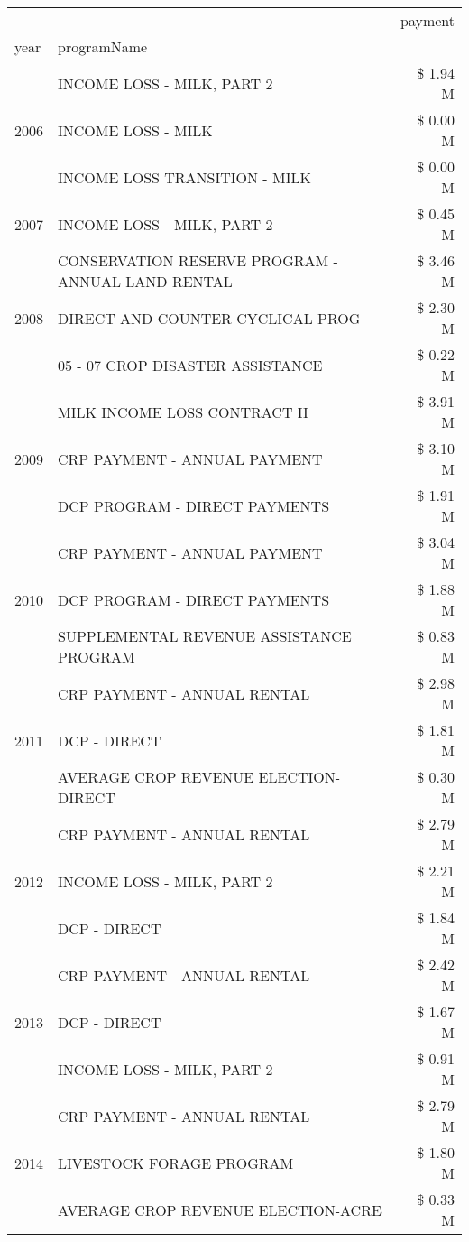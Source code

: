 \begin{tabular}{llr}
\toprule
 &  & payment \\
year & programName &  \\
\midrule
\multirow[t]{3}{*}{2006} & INCOME LOSS - MILK, PART 2 & \$ 1.94 M \\
 & INCOME LOSS - MILK & \$ 0.00 M \\
 & INCOME LOSS TRANSITION - MILK & \$ 0.00 M \\
\cline{1-3}
2007 & INCOME LOSS - MILK, PART 2 & \$ 0.45 M \\
\cline{1-3}
\multirow[t]{3}{*}{2008} & CONSERVATION RESERVE PROGRAM - ANNUAL LAND RENTAL & \$ 3.46 M \\
 & DIRECT AND COUNTER CYCLICAL PROG & \$ 2.30 M \\
 & 05 - 07 CROP DISASTER ASSISTANCE & \$ 0.22 M \\
\cline{1-3}
\multirow[t]{3}{*}{2009} & MILK INCOME LOSS CONTRACT II & \$ 3.91 M \\
 & CRP PAYMENT - ANNUAL PAYMENT & \$ 3.10 M \\
 & DCP PROGRAM - DIRECT PAYMENTS & \$ 1.91 M \\
\cline{1-3}
\multirow[t]{3}{*}{2010} & CRP PAYMENT - ANNUAL PAYMENT & \$ 3.04 M \\
 & DCP PROGRAM - DIRECT PAYMENTS & \$ 1.88 M \\
 & SUPPLEMENTAL REVENUE ASSISTANCE PROGRAM & \$ 0.83 M \\
\cline{1-3}
\multirow[t]{3}{*}{2011} & CRP PAYMENT - ANNUAL RENTAL & \$ 2.98 M \\
 & DCP - DIRECT & \$ 1.81 M \\
 & AVERAGE CROP REVENUE ELECTION-DIRECT & \$ 0.30 M \\
\cline{1-3}
\multirow[t]{3}{*}{2012} & CRP PAYMENT - ANNUAL RENTAL & \$ 2.79 M \\
 & INCOME LOSS - MILK, PART 2 & \$ 2.21 M \\
 & DCP - DIRECT & \$ 1.84 M \\
\cline{1-3}
\multirow[t]{3}{*}{2013} & CRP PAYMENT - ANNUAL RENTAL & \$ 2.42 M \\
 & DCP - DIRECT & \$ 1.67 M \\
 & INCOME LOSS - MILK, PART 2 & \$ 0.91 M \\
\cline{1-3}
\multirow[t]{3}{*}{2014} & CRP PAYMENT - ANNUAL RENTAL & \$ 2.79 M \\
 & LIVESTOCK FORAGE PROGRAM & \$ 1.80 M \\
 & AVERAGE CROP REVENUE ELECTION-ACRE & \$ 0.33 M \\

\end{tabular}
